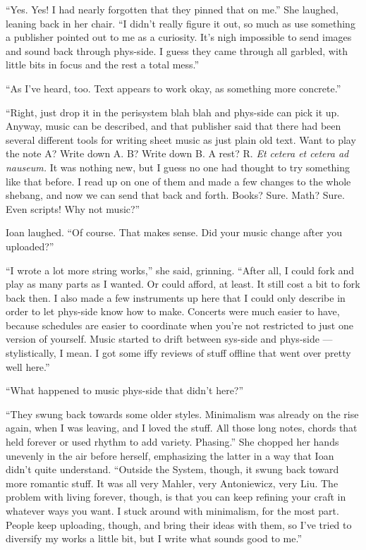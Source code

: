 ``Yes. Yes! I had nearly forgotten that they pinned that on me.'' She laughed, leaning back in her chair. ``I didn't really figure it out, so much as use something a publisher pointed out to me as a curiosity. It's nigh impossible to send images and sound back through phys-side. I guess they came through all garbled, with little bits in focus and the rest a total mess.''

``As I've heard, too. Text appears to work okay, as something more concrete.''

``Right, just drop it in the perisystem blah blah and phys-side can pick it up. Anyway, music can be described, and that publisher said that there had been several different tools for writing sheet music as just plain old text. Want to play the note A? Write down A. B? Write down B. A rest? R. \emph{Et cetera et cetera ad nauseum.} It was nothing new, but I guess no one had thought to try something like that before. I read up on one of them and made a few changes to the whole shebang, and now we can send that back and forth. Books? Sure. Math? Sure. Even scripts! Why not music?''

Ioan laughed. ``Of course. That makes sense. Did your music change after you uploaded?''

``I wrote a lot more string works,'' she said, grinning. ``After all, I could fork and play as many parts as I wanted. Or could afford, at least. It still cost a bit to fork back then. I also made a few instruments up here that I could only describe in order to let phys-side know how to make. Concerts were much easier to have, because schedules are easier to coordinate when you're not restricted to just one version of yourself. Music started to drift between sys-side and phys-side — stylistically, I mean. I got some iffy reviews of stuff offline that went over pretty well here.''

``What happened to music phys-side that didn't here?''

``They swung back towards some older styles. Minimalism was already on the rise again, when I was leaving, and I loved the stuff. All those long notes, chords that held forever or used rhythm to add variety. Phasing.'' She chopped her hands unevenly in the air before herself, emphasizing the latter in a way that Ioan didn't quite understand. ``Outside the System, though, it swung back toward more romantic stuff. It was all very Mahler, very Antoniewicz, very Liu. The problem with living forever, though, is that you can keep refining your craft in whatever ways you want. I stuck around with minimalism, for the most part. People keep uploading, though, and bring their ideas with them, so I've tried to diversify my works a little bit, but I write what sounds good to me.''

